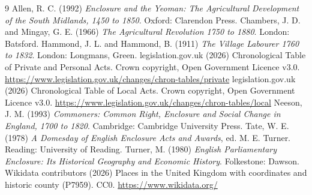 \documentclass[11pt,a4paper]{article}
\begin{document}
\begin{thebibliography}{9}
 Allen, R. C. (1992) \textit{Enclosure and the Yeoman: The Agricultural Development of the South Midlands, 1450 to 1850}. Oxford: Clarendon Press.
 Chambers, J. D. and Mingay, G. E. (1966) \textit{The Agricultural Revolution 1750 to 1880}. London: Batsford.
 Hammond, J. L. and Hammond, B. (1911) \textit{The Village Labourer 1760 to 1832}. London: Longmans, Green.
 legislation.gov.uk (2026) Chronological Table of Private and Personal Acts. Crown copyright, Open Government Licence v3.0. \url{https://www.legislation.gov.uk/changes/chron-tables/private}
 legislation.gov.uk (2026) Chronological Table of Local Acts. Crown copyright, Open Government Licence v3.0. \url{https://www.legislation.gov.uk/changes/chron-tables/local}
 Neeson, J. M. (1993) \textit{Commoners: Common Right, Enclosure and Social Change in England, 1700 to 1820}. Cambridge: Cambridge University Press.
 Tate, W. E. (1978) \textit{A Domesday of English Enclosure Acts and Awards}, ed. M. E. Turner. Reading: University of Reading.
 Turner, M. (1980) \textit{English Parliamentary Enclosure: Its Historical Geography and Economic History}. Folkestone: Dawson.
 Wikidata contributors (2026) Places in the United Kingdom with coordinates and historic county (P7959). CC0. \url{https://www.wikidata.org/}
\end{thebibliography}
\end{document}
